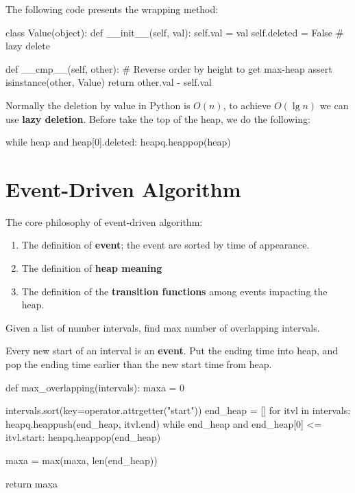 The following code presents the wrapping method:
\begin{python}
class Value(object):
    def __init__(self, val):
        self.val = val
        self.deleted = False  # lazy delete 

    def __cmp__(self, other):
        # Reverse order by height to get max-heap
        assert isinstance(other, Value)
        return other.val - self.val
\end{python}

Normally the deletion by value in Python is $O(n)$, to achieve $O(\lg n)$ we can use \textbf{lazy deletion}. Before take the top of the heap, we do the following:
\begin{python}
while heap and heap[0].deleted:
    heapq.heappop(heap)
\end{python}

\section{Event-Driven Algorithm}
The core philosophy of event-driven algorithm:
\begin{enumerate}
\item The definition of \textbf{event}; the event are sorted by time of appearance.
\item The definition of \textbf{heap meaning}
\item The definition of the \textbf{transition functions} among events impacting the heap. 
\end{enumerate} 

 Given a list of number intervals, find max number of overlapping intervals. 

Every new start of an interval is an \textbf{event}. Put the ending time into heap, and pop the ending time earlier than the new start time from heap.

\begin{python}
def max_overlapping(intervals):
    maxa = 0

    intervals.sort(key=operator.attrgetter("start"))
    end_heap = []
    for itvl in intervals:
        heapq.heappush(end_heap, itvl.end)
        while end_heap and end_heap[0] <= itvl.start:
            heapq.heappop(end_heap)

        maxa = max(maxa, len(end_heap))

    return maxa
\end{python}
